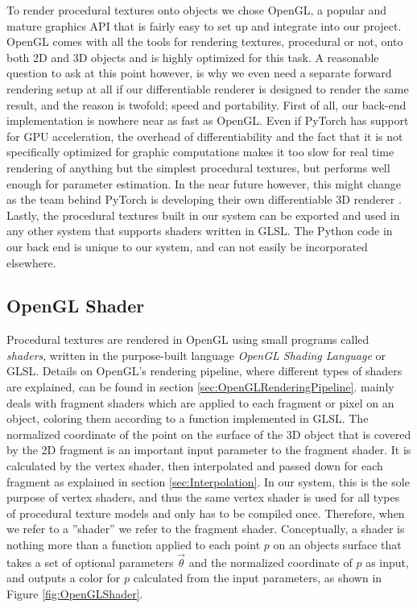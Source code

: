 To render procedural textures onto objects we chose OpenGL, a popular and mature graphics API that is fairly easy to set up and integrate into our project. OpenGL comes with all the tools for rendering textures, procedural or not, onto both 2D and 3D objects and is highly optimized for this task. A reasonable question to ask at this point however, is why we even need a separate forward rendering setup at all if our differentiable renderer is designed to render the same result, and the reason is twofold; speed and portability. First of all, our back-end implementation is nowhere near as fast as OpenGL. Even if PyTorch has support for GPU acceleration, the overhead of differentiability and the fact that it is not specifically optimized for graphic computations makes it too slow for real time rendering of anything but the simplest procedural textures, but performs well enough for parameter estimation. In the near future however, this might change as the team behind PyTorch is developing their own differentiable 3D renderer \cite{facebookresearch_2020_facebookresearchpytorch3d}. Lastly, the procedural textures built in our system can be exported and used in any other system that supports shaders written in GLSL. The Python code in our back end is unique to our system, and can not easily be incorporated elsewhere.

\subsection{OpenGL Shader}\label{sec:MethodOpenGLShader}

Procedural textures are rendered in OpenGL using small programs called \textit{shaders}, written in the purpose-built language \textit{OpenGL Shading Language} or GLSL. Details on OpenGL's rendering pipeline, where different types of shaders are explained, can be found in section \ref{sec:OpenGLRenderingPipeline}. \dipter{} mainly deals with fragment shaders which are applied to each fragment or pixel on an object, coloring them according to a function implemented in GLSL. The normalized coordinate of the point on the surface of the 3D object that is covered by the 2D fragment is an important input parameter to the fragment shader. It is calculated by the vertex shader, then interpolated and passed down for each fragment as explained in section \ref{sec:Interpolation}. In our system, this is the sole purpose of vertex shaders, and thus the same vertex shader is used for all types of procedural texture models and only has to be compiled once. Therefore, when we refer to a ''shader'' we refer to the fragment shader. Conceptually, a shader is nothing more than a function applied to each point $p$ on an objects surface that takes a set of optional parameters $\Vec{\theta}$ and the normalized coordinate of $p$ as input, and outputs a color for $p$ calculated from the input parameters, as shown in Figure \ref{fig:OpenGLShader}.


